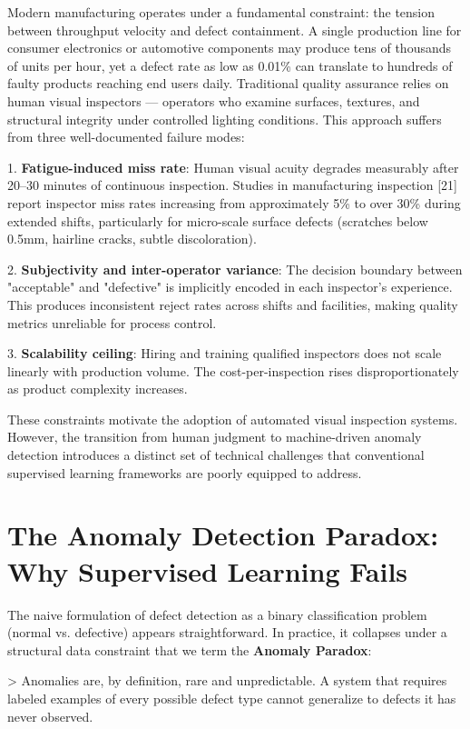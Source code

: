 \documentclass[12pt,a4paper,oneside]{report}
\begin{document}
Modern manufacturing operates under a fundamental constraint: the tension between throughput velocity and defect containment. A single production line for consumer electronics or automotive components may produce tens of thousands of units per hour, yet a defect rate as low as 0.01\% can translate to hundreds of faulty products reaching end users daily. Traditional quality assurance relies on human visual inspectors --- operators who examine surfaces, textures, and structural integrity under controlled lighting conditions. This approach suffers from three well-documented failure modes:

1. \textbf{Fatigue-induced miss rate}: Human visual acuity degrades measurably after 20--30 minutes of continuous inspection. Studies in manufacturing inspection [21] report inspector miss rates increasing from approximately 5\% to over 30\% during extended shifts, particularly for micro-scale surface defects (scratches below 0.5mm, hairline cracks, subtle discoloration).

2. \textbf{Subjectivity and inter-operator variance}: The decision boundary between "acceptable" and "defective" is implicitly encoded in each inspector's experience. This produces inconsistent reject rates across shifts and facilities, making quality metrics unreliable for process control.

3. \textbf{Scalability ceiling}: Hiring and training qualified inspectors does not scale linearly with production volume. The cost-per-inspection rises disproportionately as product complexity increases.

These constraints motivate the adoption of automated visual inspection systems. However, the transition from human judgment to machine-driven anomaly detection introduces a distinct set of technical challenges that conventional supervised learning frameworks are poorly equipped to address.

\section{The Anomaly Detection Paradox: Why Supervised Learning Fails}

The naive formulation of defect detection as a binary classification problem (normal vs. defective) appears straightforward. In practice, it collapses under a structural data constraint that we term the \textbf{Anomaly Paradox}:

> Anomalies are, by definition, rare and unpredictable. A system that requires labeled examples of every possible defect type cannot generalize to defects it has never observed.
\end{document}
